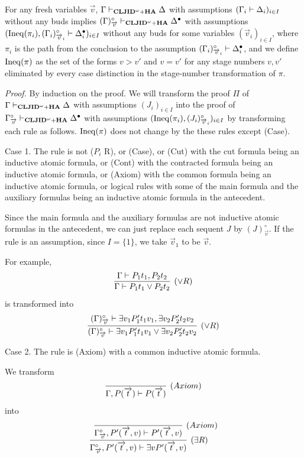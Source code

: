 \begin{Prop}\label{prop:birthtrans1}
For any fresh variables $\Vec v$, 
$\Gamma \mathrel \vdash_{{\bf CLJID}^\omega+{\bf HA}} \Delta$ with assumptions $(\Gamma_i \mathrel \vdash \Delta_i)_{i \in I}$
without any buds
implies 
$(\Gamma)^\circ_{\overrightarrow v} \mathrel \vdash_{{\bf CLJID}^\omega+{\bf HA}} \Delta^\bullet$
with assumptions $({\rm Ineq}(\pi_i),(\Gamma_i)^\circ_{\overrightarrow v_i} \mathrel \vdash \Delta_i^\bullet)_{i \in I}$
without any buds
for some variables $(\Vec v_i)_{i \in I}$,
where $\pi_i$ is the path from the conclusion to the assumption 
$(\Gamma_i)^\circ_{\overrightarrow v_i} \mathrel \vdash \Delta_i^\bullet$,
and we define ${\rm Ineq}(\pi)$ as the set of the forms
$v > v'$ and $v = v'$ for any stage numbers $v,v'$
eliminated by every case distinction 
in the stage-number transformation of $\pi$.
\end{Prop}

{\em Proof.}
By induction on the proof.
We will transform
the proof $\Pi$ of $\Gamma \mathrel \vdash_{{\bf CLJID}^\omega+{\bf HA}} \Delta$ with assumptions $(J_i)_{i \in I}$ into
the proof of $\Gamma^\circ_{\overrightarrow v} \mathrel \vdash_{{\bf CLJID}^\omega+{\bf HA}} \Delta^\bullet$ with 
assumptions $({\rm Ineq}(\pi_i),(J_i)^\circ_{\overrightarrow v_i})_{i \in I}$ by
transforming each rule as follows.
${\rm Ineq}(\pi)$ does not change by the these rules except (Case).

Case 1. The rule is not ($P_i$ R), or (Case), or (Cut)
with the cut formula being an inductive atomic formula,
or (Cont) with the contracted formula being an inductive atomic formula,
or (Axiom) with the common formula being an inductive atomic formula,
or logical rules with
some of the main formula and the auxiliary formulas being
an inductive atomic formula in the antecedent.

Since the main formula and the auxiliary formulas
are not inductive atomic formulas in the antecedent, 
we can just replace each sequent $J$ by $(J)^\circ_{\Vec v}$.
If the rule is an assumption, since $I=\{1\}$,
we take $\Vec v_1$ to be $\Vec v$.

For example,
\[
\infer[(\lor R)]{\Gamma \prove P_1t_1 \lor P_2t_2}{
\Gamma \prove P_1t_1,P_2t_2
}
\]
is transformed into
\[
\infer[(\lor R)]{(\Gamma)^\circ_{\Vec v} \prove \exists v_1P'_1t_1v_1 \lor \exists v_2P'_2t_2v_2}{
(\Gamma)^\circ_{\Vec v} \prove \exists v_1P'_1t_1v_1, \exists v_2P'_2t_2v_2
}
\]

Case 2. The rule is (Axiom) with a common inductive atomic formula.

We transform
\[
\infer[(Axiom)]{\Gamma,P(\Vec t) \prove P(\Vec t)}{}
\]
into 
\[
\infer[(\exists R)]{\Gamma^\circ_{\Vec v},P'(\Vec t,v) \prove \exists vP'(\Vec t,v)}{
	\infer[(Axiom)]{\Gamma^\circ_{\Vec v},P'(\Vec t,v) \prove P'(\Vec t,v)}{}
}
\]

